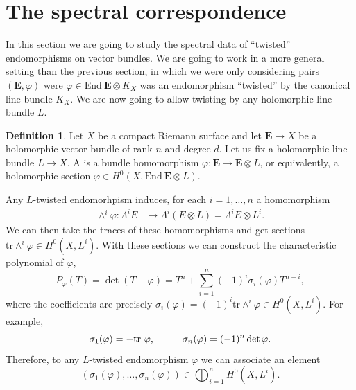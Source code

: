 \documentclass[12pt,a4paper]{book}
\theoremstyle{definition} \newtheorem{defn}[thm]{Definition}
\theoremstyle{definition} \newtheorem{ejemplo}[thm]{Example}
\theoremstyle{remark} \newtheorem{rem}[thm]{Remark}
\def\tr{\mathrm{tr}}
\def\End{\mathrm{End}}
\newcommand{\ve}[1]{\mathbf{#1}}
\let\emph\relax
\begin{document}
    \section{The spectral correspondence}
    In this section we are going to study the spectral data of ``twisted'' endomorphisms on vector bundles. We are going to work in a more general setting than the previous section, in which we were only considering pairs $(\ve{E},\varphi)$ were $\varphi\in \End\ \ve{E} \otimes K_X$ was an endomorphism ``twisted'' by the canonical line bundle $K_X$. We are now going to allow twisting by any holomorphic line bundle $L$.

    \begin{defn}
      Let $X$ be a compact Riemann surface and let $\ve{E}\rightarrow X$ be a holomorphic vector bundle of rank $n$ and degree $d$. Let us fix a holomorphic line bundle $L\rightarrow X$. A \emph{$L$-twisted endomorphism} is a bundle homomorphism $\varphi:\ve{E}\rightarrow \ve{E}\otimes L$, or equivalently, a holomorphic section $\varphi \in H^0(X,\End\ \ve{E} \otimes L)$.
    \end{defn}

    Any $L$-twisted endomorhpism induces, for each $i=1,\dots,n$ a homomorphism
    \begin{align*}
      \wedge^i\varphi : \Lambda^i E&\longrightarrow \Lambda^i(E\otimes L)= \Lambda^i E \otimes L^{i}.
      \end{align*}
      We can then take the traces of these homomorphisms and get sections $\tr \wedge^i \varphi \in H^0(X,L^{i})$. With these sections we can construct the characteristic polynomial of $\varphi$, 
      \begin{equation*}
	P_\varphi(T)=\det(T-\varphi)=T^n+\sum_{i=1}^n (-1)^i \sigma_i(\varphi) T^{n-i},
      \end{equation*}
      where the coefficients are precisely $\sigma_i(\varphi)=(-1)^i\tr \wedge^i \varphi \in H^0(X,L^{i})$. For example, $$\sigma_1(\varphi)=-\tr\ \varphi, \hspace{1 cm} \sigma_n(\varphi)=(-1)^n \det \varphi.$$
      Therefore, to any $L$-twisted endomorphism $\varphi$ we can associate an element 
      \begin{equation*}
	(\sigma_1(\varphi),\dots,\sigma_n(\varphi)) \in \bigoplus_{i=1}^n H^0(X,L^i).
      \end{equation*}
\end{document}
